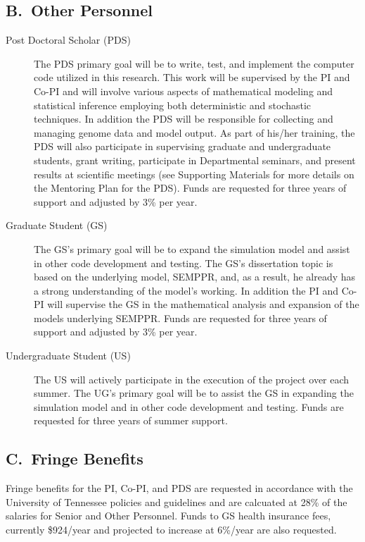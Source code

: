 \documentclass[11pt,fleqn]{article}
\begin{document}
\subsection*{B.~Other Personnel}
\begin{description}
\item[Post Doctoral Scholar (PDS)]
The PDS primary goal will be to write, test, and implement the computer code utilized in this research.
This work will be supervised by the PI and Co-PI and will involve various aspects of mathematical modeling and statistical inference employing both deterministic and stochastic techniques. 
In addition the PDS will be responsible for collecting and managing genome data and model output.
As part of his/her training, the PDS will also participate in supervising graduate and undergraduate students, grant writing,  participate in Departmental seminars, and present results at scientific meetings (see Supporting Materials for more details on the Mentoring Plan for the PDS).
Funds are requested for three years of support and adjusted by 3\% per year.

\item[Graduate Student (GS)]
The GS's primary goal will be to expand the simulation model and assist in other code development and testing.
The GS's dissertation topic is based on the underlying model, SEMPPR, and, as a result, he already has a strong understanding of the model's working.
In addition the PI and Co-PI will supervise the GS in the mathematical analysis and expansion of the models underlying SEMPPR.
Funds are requested for three years of support and adjusted by 3\% per year.

\item[Undergraduate Student (US)]
The US will actively participate in the execution of the project over each summer.
The UG's primary goal will be to assist the GS in expanding the simulation model and in other code development and testing.
Funds are requested for three years of summer support.  
\end{description}

\subsection*{C.~Fringe Benefits}
Fringe benefits for the PI, Co-PI, and PDS are requested in accordance with the University of Tennessee policies and guidelines and are calcuated at 28\% of the salaries for Senior and Other Personnel.
Funds to GS health insurance fees, currently \$924/year and projected to increase at 6\%/year are also requested.
\end{document}
